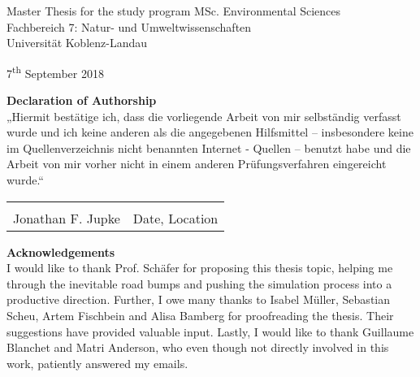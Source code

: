 \documentclass[a4paper,12pt]{article}
\begin{document}
\begin{titlepage}
\begin{center}
				\vfill

			
				\begingroup
					\small
					Master Thesis for the study program MSc. Environmental Sciences\\
					Fachbereich 7: Natur- und Umweltwissenschaften \\
					Universit{\"a}t Koblenz-Landau
				\endgroup
				
				\vfill
				
				7\textsuperscript{th} September 2018
				
				
			\end{center}     	
		\end{titlepage}
		
		\newpage
			
		
		\huge
		\textbf{Declaration of Authorship}\bigskip\\
		
		\normalsize
		\noindent „Hiermit best{\"a}tige ich, dass die vorliegende Arbeit von mir selbst{\"a}ndig verfasst wurde und ich keine 
		anderen als die angegebenen Hilfsmittel -- insbesondere keine im Quellenverzeichnis nicht benannten Internet - Quellen --
		benutzt habe und die Arbeit von mir vorher nicht in einem anderen Pr{\"u}fungsverfahren eingereicht wurde.“\bigskip\bigskip\\
		
		\noindent\begin{tabular}{ll}
			\makebox[2.5in]{\hrulefill} & \makebox[2.5in]{\hrulefill}\\
			Jonathan F. Jupke & Date, Location\\[8ex]%
			
		\end{tabular}	

		\newpage	
		
	
		\huge
		\textbf{Acknowledgements}\bigskip\\
		
		\normalsize
		I would like to thank Prof. Sch{\"a}fer for proposing this thesis topic, helping me through the inevitable road bumps and pushing the simulation process into a productive direction. 
		Further, I owe many thanks to Isabel M{\"u}ller, Sebastian Scheu, Artem Fischbein and Alisa Bamberg for proofreading the thesis.
		Their suggestions have provided valuable input. 
		Lastly, I would like to thank Guillaume Blanchet and Matri Anderson, who even though not directly involved in this work, patiently answered my emails. 
		
\end{document}
